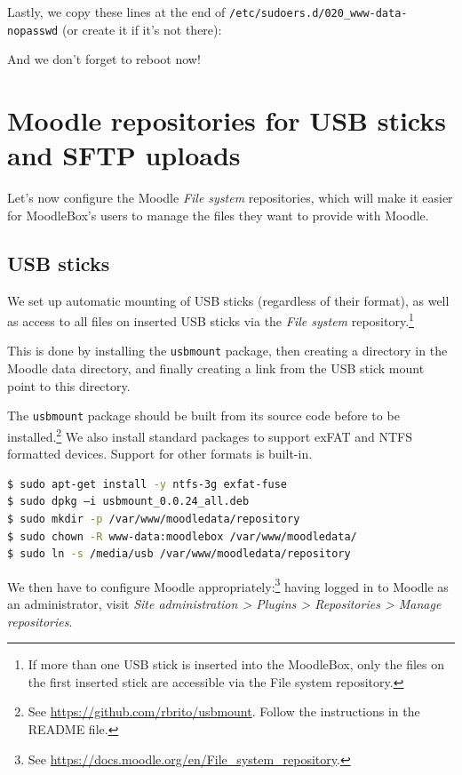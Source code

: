 \documentclass[12pt]{article}
\begin{document}
Lastly, we copy these lines at the end of \lstinline{/etc/sudoers.d/020_www-data-nopasswd} (or create it if it's not there):


And we don't forget to reboot now!

\section{Moodle repositories for USB sticks and SFTP uploads}

Let's now configure the Moodle \textsl{File system} repositories, which will make it easier for MoodleBox's users to manage the files they want to provide with Moodle.

\subsection{USB sticks}

We set up automatic mounting of USB sticks (regardless of their format), as well as access to all files on inserted USB sticks via the \textsl{File system} repository.\footnote{If more than one USB stick is inserted into the MoodleBox, only the files on the first inserted stick are accessible via the File system repository.}

This is done by installing the \lstinline{usbmount} package, then creating a directory in the Moodle data directory, and finally creating a link from the USB stick mount point to this directory.

The \lstinline{usbmount} package should be built from its source code before to be installed.\footnote{See \url{https://github.com/rbrito/usbmount}. Follow the instructions in the README file.}
We also install standard packages to support exFAT and NTFS formatted devices. Support for other formats is built-in.

\begin{lstlisting}[language=bash]
$ sudo apt-get install -y ntfs-3g exfat-fuse
$ sudo dpkg –i usbmount_0.0.24_all.deb
$ sudo mkdir -p /var/www/moodledata/repository
$ sudo chown -R www-data:moodlebox /var/www/moodledata/
$ sudo ln -s /media/usb /var/www/moodledata/repository
\end{lstlisting}

We then have to configure Moodle appropriately:\footnote{See \url{https://docs.moodle.org/en/File_system_repository}.}
having logged in to Moodle as an administrator, visit \emph{Site administration > Plugins > Repositories > Manage repositories}.
\end{document}
